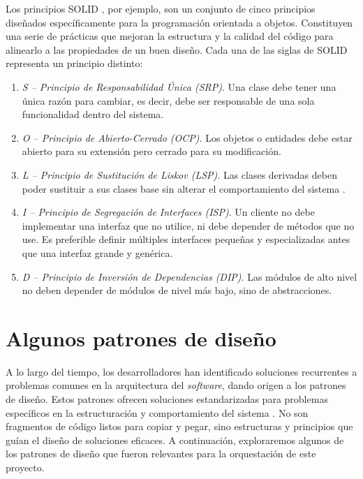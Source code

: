 Los principios SOLID \citep{martin2000design}, por ejemplo, son un conjunto de cinco principios diseñados específicamente para la programación orientada a objetos. Constituyen una serie de prácticas que mejoran la estructura y la calidad del código para alinearlo a las propiedades de un buen diseño. Cada una de las siglas de SOLID representa un principio distinto:

\begin{enumerate}
    \item \emph{S -- Principio de Responsabilidad Única (SRP)}.
    Una clase debe tener una única razón para cambiar, es decir, debe ser responsable de una sola funcionalidad dentro del sistema.

    \item \emph{O -- Principio de Abierto-Cerrado (OCP)}.
    Los objetos o entidades debe estar abierto para su extensión pero cerrado para su modificación.

    \item \emph{L -- Principio de Sustitución de Liskov (LSP)}.
    Las clases derivadas deben poder sustituir a sus clases base sin alterar el comportamiento del sistema \citep{liskov1994subtyping}.

    \item \emph{I -- Principio de Segregación de Interfaces (ISP)}.
    Un cliente no debe implementar una interfaz que no utilice, ni debe depender de métodos que no use. Es preferible definir múltiples interfaces pequeñas y especializadas antes que una interfaz grande y genérica.
    
    \item \emph{D -- Principio de Inversión de Dependencias (DIP)}.
    Las módulos de alto nivel no deben depender de módulos de nivel más bajo, sino de abstracciones.
\end{enumerate}

\section{Algunos patrones de diseño}

A lo largo del tiempo, los desarrolladores han identificado soluciones recurrentes a problemas comunes en la arquitectura del \emph{software}, dando origen a los patrones de diseño. Estos patrones ofrecen soluciones estandarizadas para problemas específicos en la estructuración y comportamiento del sistema \citep{gamma1995designpatterns, shvets2018dive}. No son fragmentos de código listos para copiar y pegar, sino estructuras y principios que guían el diseño de soluciones eficaces. A continuación, exploraremos algunos de los patrones de diseño que fueron relevantes para la orquestación de este proyecto.

